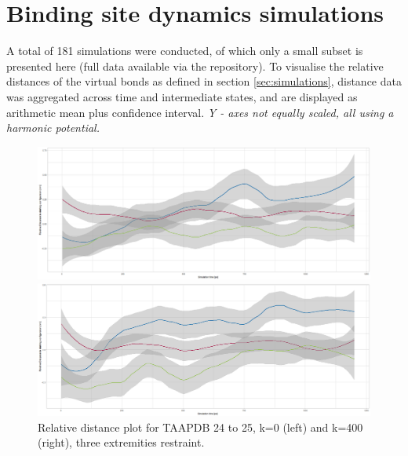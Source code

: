 \documentclass[oneside]{scrreprt}
\begin{document}
\section{Binding site dynamics simulations}\label{sec:results_bsdynamics}
A total of 181 simulations were conducted, of which only a small subset is presented here (full data available via the repository). To visualise the relative distances of the virtual bonds as defined in section \ref{sec:simulations}, distance data was aggregated across time and intermediate states, and are displayed as arithmetic mean plus confidence interval. \emph{Y - axes not equally scaled, all using a harmonic potential.}
\begin{figure}[h]\label{fig:reldist_taapdb}
    
    

\begin{minipage}{0.5\textwidth}
\includegraphics[width=1\textwidth]{plots/reldistplot_taapdb2425_k0ex3.png}
\end{minipage}
\begin{minipage}{0.5\textwidth}
\includegraphics[width=1\textwidth]{plots/reldistplot_taapdb2425_k400ex3.png}
\end{minipage}


\caption[Relative distance plot: TAAPDB 24 to 25, k=0 and k=400]{Relative distance plot for TAAPDB  24 to 25, k=0 (left) and k=400 (right), three extremities restraint.}
\end{figure}
\end{document}
